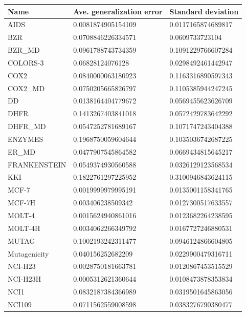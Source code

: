 \begin{table}[!ht]
    \centering
    \footnotesize
    \begin{tabular}{p{3.5cm}|p{5cm}p{5cm}}
    \hline
    \toprule
        Name & Ave. generalization error & Standard deviation \\ 
    \midrule
        AIDS & 0.0081874905154109 & 0.0117165874689817 \\ 
        BZR & 0.0708846226334571 & 0.0609733723104 \\ 
        BZR\_MD & 0.0961788743734359 & 0.1091229766607284 \\ 
        COLORS-3 & 0.06828124076128 & 0.0298492461442947 \\ 
        COX2 & 0.0840000063180923 & 0.1163316890597343 \\ 
        COX2\_MD & 0.0750205665826797 & 0.1105385944247245 \\ 
        DD & 0.0138164404779672 & 0.0569455623626709 \\ 
        DHFR & 0.1413267403841018 & 0.0572429783642292 \\ 
        DHFR\_MD & 0.0547252781689167 & 0.1071747243404388 \\ 
        ENZYMES & 0.1968750059604644 & 0.1035036742687225 \\ 
        ER\_MD & 0.0477907545864582 & 0.0669434815645217 \\ 
        FRANKENSTEIN & 0.0549374930560588 & 0.0326129123568534 \\ 
        KKI & 0.1822761297225952 & 0.3100946843624115 \\ 
        MCF-7 & 0.0019999979995191 & 0.0135001158341765 \\ 
        MCF-7H & 0.003406238509342 & 0.0127300517633557 \\ 
        MOLT-4 & 0.0015624940861016 & 0.0123682264238595 \\ 
        MOLT-4H & 0.0034062266349792 & 0.0167727246880531 \\ 
        MUTAG & 0.1002193242311477 & 0.0946124866604805 \\ 
        Mutagenicity & 0.040156252682209 & 0.0229900479316711 \\ 
        NCI-H23 & 0.0028750181663781 & 0.0120867453515529 \\ 
        NCI-H23H & 0.0005312621360644 & 0.0108473878353834 \\ 
        NCI1 & 0.0832187384366989 & 0.0319501645863056 \\ 
        NCI109 & 0.0711562559008598 & 0.0383276790380477 \\ 

\end{tabular}
\end{table}
